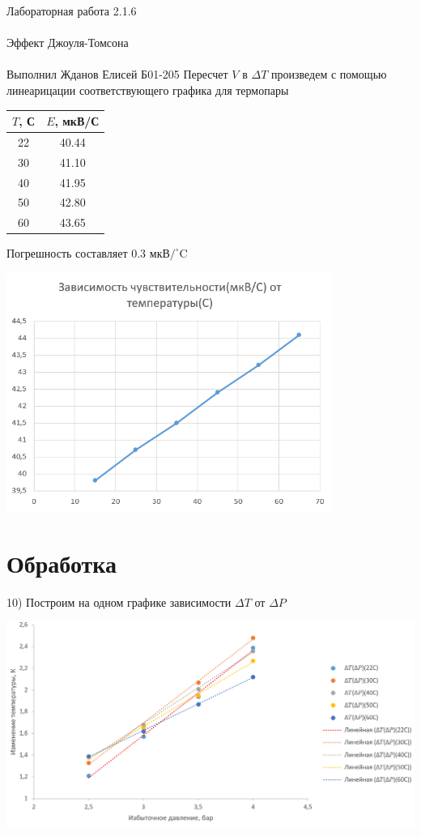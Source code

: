 \documentclass{astroedu-lab}
\begin{document}
\begin{problem}{\huge Лабораторная работа 2.1.6\\\\Эффект Джоуля-Томсона\\\\Выполнил Жданов Елисей Б01-205}
Пересчет $V$ в $\Delta T$ произведем с помощью линеарицации соответствующего графика для термопары

\begin{center}
\begin{tabular}{|c|c|}
\hline
$T$, С & $E$, мкВ/С \\ \hline
22 & 40.44 \\
30 & 41.10 \\
40 & 41.95 \\
50 & 42.80 \\
60 & 43.65 \\
\hline
\end{tabular}
\end{center}

Погрешность составляет $0.3$ мкВ$/ ^\circ$C

\begin{center}
\includegraphics[width=0.8\textwidth]{термо.png}
\label{ris:image}
\end{center}

\section{Обработка}

10) Построим на одном графике зависимости $\Delta T$ от $\Delta P$

\begin{center}
\includegraphics[width=1\textwidth]{1_plot.png}
\label{ris:image}
\end{center}


\end{problem}
\end{document}
